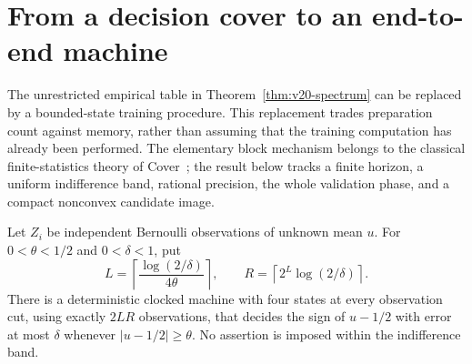 \section{From a decision cover to an end-to-end machine}
\label{sec:v21-clocked}
The unrestricted empirical table in Theorem~\ref{thm:v20-spectrum} can
be replaced by a bounded-state training procedure. This replacement
trades preparation count against memory, rather than assuming that the
training computation has already been performed. The elementary block
mechanism belongs to the classical finite-statistics theory of
Cover~\cite{Cover1969}; the result below tracks a finite horizon, a
uniform indifference band, rational precision, the whole validation
phase, and a compact nonconvex candidate image.

\begin{lemma}\label{lem:v21-block}
Let $Z_i$ be independent Bernoulli observations of unknown mean $u$.
For $0<\theta<1/2$ and $0<\delta<1$, put
\begin{equation}\label{eq:v21-LR}
 L=\left\lceil\frac{\log(2/\delta)}{4\theta}\right\rceil,
 \qquad
 R=\left\lceil2^L\log(2/\delta)\right\rceil.
\end{equation}
There is a deterministic clocked machine with four states at every
observation cut, using exactly $2LR$ observations, that decides the sign
of $u-1/2$ with error at most $\delta$ whenever $|u-1/2|\ge\theta$.
No assertion is imposed within the indifference band.
\end{lemma}

